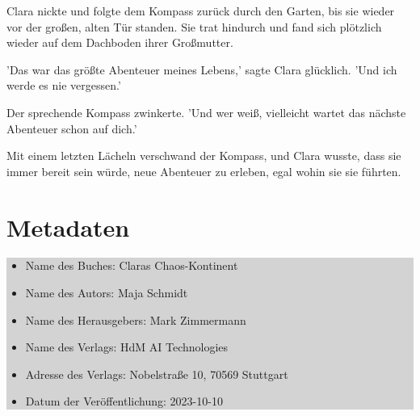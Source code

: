 \documentclass[12pt]{article}
\begin{document}
Clara nickte und folgte dem Kompass zurück durch den Garten, bis sie wieder vor der großen, alten Tür standen. Sie trat hindurch und fand sich plötzlich wieder auf dem Dachboden ihrer Großmutter.

'Das war das größte Abenteuer meines Lebens,' sagte Clara glücklich. 'Und ich werde es nie vergessen.'

Der sprechende Kompass zwinkerte. 'Und wer weiß, vielleicht wartet das nächste Abenteuer schon auf dich.'

Mit einem letzten Lächeln verschwand der Kompass, und Clara wusste, dass sie immer bereit sein würde, neue Abenteuer zu erleben, egal wohin sie sie führten.

\clearpage

\section*{Metadaten}
\colorbox{lightgray}{
    \begin{minipage}{\dimexpr\textwidth-2\fboxsep}
        \vspace{1cm}
        \begin{itemize}
            \item Name des Buches: Claras Chaos-Kontinent
            \item Name des Autors: Maja Schmidt
            \item Name des Herausgebers: Mark Zimmermann
            \item Name des Verlags: HdM AI Technologies
            \item Adresse des Verlags: Nobelstraße 10, 70569 Stuttgart
            \item Datum der Veröffentlichung: 2023-10-10
        \end{itemize}
        \vspace{1cm}
    \end{minipage}
}
\end{document}
